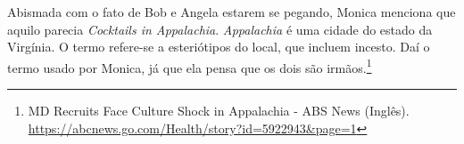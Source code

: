 Abismada com o fato de Bob e Angela estarem se pegando, Monica menciona
que aquilo parecia \emph{Cocktails in Appalachia}. \emph{Appalachia} é
uma cidade do estado da Virgínia. O termo refere-se a esteriótipos do
local, que incluem incesto. Daí o termo usado por Monica, já que ela
pensa que os dois são irmãos.\footnote{\sloppy MD Recruits Face Culture Shock in Appalachia - ABS News (Inglês). \url{https://abcnews.go.com/Health/story?id=5922943\&page=1}}
